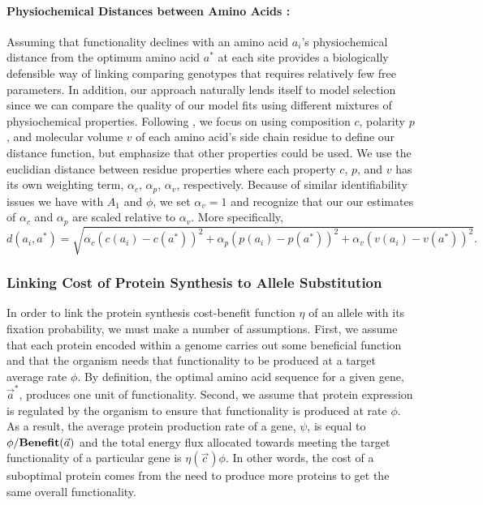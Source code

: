 \documentclass{article}
\newcommand{\Func}{\ensuremath{\text{\textbf{Benefit}}}\xspace}
\newcommand{\alphac}{\ensuremath{\alpha_c}\xspace}
\newcommand{\alphap}{\ensuremath{\alpha_p}\xspace}
\newcommand{\alphav}{\ensuremath{\alpha_v}\xspace}
\newcommand{\aoptvec}{\ensuremath{\Vec{a}^*}\xspace}
\newcommand{\aopt}{\ensuremath{a^*}\xspace}
\newcommand{\avec}{\ensuremath{\Vec{a}}\xspace}
\newcommand{\cvec}{\ensuremath{\Vec{c}}\xspace}
\begin{document}
\begin{itemize}
\paragraph*{Physiochemical Distances between Amino Acids :}
Assuming that functionality declines with an amino acid $a_i$'s physiochemical distance from the optimum amino acid \aopt at each site  provides a biologically defensible way of linking comparing genotypes that requires relatively few free parameters.
In addition, our approach naturally lends itself to model selection since we can compare the quality of our model fits using different mixtures of physiochemical properties.
Following \citet{Grantham74}, we focus on using composition $c$, polarity $p$, and molecular volume $v$ of each amino acid's side chain residue to define our distance function, but emphasize that other properties could be used.
We use the euclidian distance between residue properties where each property $c$, $p$, and $v$ has its own weighting term, $\alphac$, $\alphap$, $\alphav$, respectively.
Because of similar identifiability issues we have with $A_1$ and $\phi$, we set $\alphav = 1$ and recognize that our our estimates of $\alphac$ and $\alphap$ are scaled relative to $\alphav$.
More specifically,
\begin{equation*}
  d(a_i, \aopt) = \sqrt{\alphac \left(c\left(a_i\right) - c\left(\aopt\right)\right)^2 + \alphap \left(p\left(a_i\right) - p\left(\aopt\right)\right)^2 +  \alphav \left(v\left(a_i\right) - v\left(\aopt\right)\right)^2}.
\end{equation*}



\subsubsection*{Linking Cost of Protein Synthesis to Allele Substitution}
In order to link the protein synthesis cost-benefit function $\eta$ of an allele with its fixation probability, we must make a number of assumptions.
First, we assume that each protein encoded within a genome carries out some beneficial function and that the organism needs that functionality to be produced at a target average rate $\phi$.
By definition, the optimal amino acid sequence for a given gene, \aoptvec, produces one unit of functionality.
Second, we assume that protein expression is regulated by the organism to ensure that functionality is produced at rate $\phi$.
As a result, the average protein production rate of a gene, $\psi$, is equal to $\phi/\Func(\avec)$ and the total energy flux allocated towards meeting the target functionality of a particular gene is $\eta(\cvec) \phi$. 
In other words, the cost of a suboptimal protein comes from the need to produce more proteins to get the same overall functionality.



\end{itemize}
\end{document}
